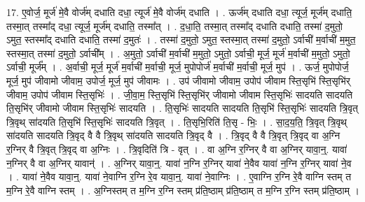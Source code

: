 \documentclass[17pt]{extarticle}
\begin{document}
17. ए॒वोर्ज॒ मूर्ज॑ मे॒वै वोर्ज॑म् दधाति दधा॒ त्यूर्ज॑ मे॒वै वोर्ज॑म् दधाति । . ऊर्ज॑म् दधाति दधा॒ त्यूर्ज॒ मूर्ज॑म् दधाति॒ तस्मा॒त् तस्मा᳚द् दधा॒ त्यूर्ज॒ मूर्ज॑म् दधाति॒ तस्मा᳚त् । . द॒धा॒ति॒ तस्मा॒त् तस्मा᳚द् दधाति दधाति॒ तस्मा॑ द॒मुतो॒ ऽमुत॒ स्तस्मा᳚द् दधाति दधाति॒ तस्मा॑ द॒मुतः॑ । . तस्मा॑ द॒मुतो॒ ऽमुत॒ स्तस्मा॒त् तस्मा॑ द॒मुतो॒ ऽर्वाची॑ म॒र्वाची॑ म॒मुत॒ स्तस्मा॒त् तस्मा॑ द॒मुतो॒ ऽर्वाची᳚म् । . अ॒मुतो॒ ऽर्वाची॑ म॒र्वाची॑ म॒मुतो॒ ऽमुतो॒ ऽर्वाची॒ मूर्ज॒ मूर्ज॑ म॒र्वाची॑ म॒मुतो॒ ऽमुतो॒ ऽर्वाची॒ मूर्ज᳚म् । . अ॒र्वाची॒ मूर्ज॒ मूर्ज॑ म॒र्वाची॑ म॒र्वाची॒ मूर्ज॒ मुपोपोर्ज॑ म॒र्वाची॑ म॒र्वाची॒ मूर्ज॒ मुप॑ । . ऊर्ज॒ मुपोपोर्ज॒ मूर्ज॒ मुप॑ जीवामो जीवाम॒ उपोर्ज॒ मूर्ज॒ मुप॑ जीवामः । . उप॑ जीवामो जीवाम॒ उपोप॑ जीवाम स्ति॒सृभि॑ स्ति॒सृभि॑र् जीवाम॒ उपोप॑ जीवाम स्ति॒सृभिः॑ । . जी॒वा॒म॒ स्ति॒सृभि॑ स्ति॒सृभि॑र् जीवामो जीवाम स्ति॒सृभिः॑ सादयति सादयति ति॒सृभि॑र् जीवामो जीवाम स्ति॒सृभिः॑ सादयति । . ति॒सृभिः॑ सादयति सादयति ति॒सृभि॑ स्ति॒सृभिः॑ सादयति त्रि॒वृत् त्रि॒वृथ् सा॑दयति ति॒सृभि॑ स्ति॒सृभिः॑ सादयति त्रि॒वृत् । . ति॒सृभि॒रिति॑ ति॒सृ - भिः॒ । . सा॒द॒य॒ति॒ त्रि॒वृत् त्रि॒वृथ् सा॑दयति सादयति त्रि॒वृद् वै वै त्रि॒वृथ् सा॑दयति सादयति त्रि॒वृद् वै । . त्रि॒वृद् वै वै त्रि॒वृत् त्रि॒वृद् वा अ॒ग्नि र॒ग्निर् वै त्रि॒वृत् त्रि॒वृद् वा अ॒ग्निः । . त्रि॒वृदिति॑ त्रि - वृत् । . वा अ॒ग्नि र॒ग्निर् वै वा अ॒ग्निर् यावा॒न्॒. यावा॑ न॒ग्निर् वै वा अ॒ग्निर् यावान्॑ । . अ॒ग्निर् यावा॒न्॒. यावा॑ न॒ग्नि र॒ग्निर् यावा॑ ने॒वैव यावा॑ न॒ग्नि र॒ग्निर् यावा॑ ने॒व । . यावा॑ ने॒वैव यावा॒न्॒. यावा॑ ने॒वाग्नि र॒ग्नि रे॒व यावा॒न्॒. यावा॑ ने॒वाग्निः । . ए॒वाग्नि र॒ग्नि रे॒वै वाग्नि स्तम् त म॒ग्नि रे॒वै वाग्नि स्तम् । . अ॒ग्निस्तम् त म॒ग्नि र॒ग्नि स्तम् प्र॑ति॒ष्ठाम् प्र॑ति॒ष्ठाम् त म॒ग्नि र॒ग्नि स्तम् प्र॑ति॒ष्ठाम् । \newline
\end{document}
